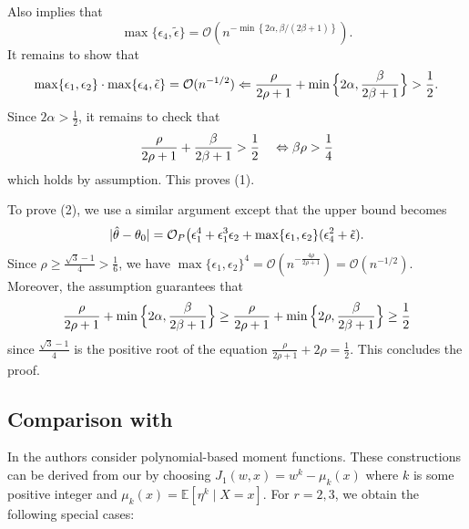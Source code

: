 \documentclass{article}
\def\eps{{\epsilon}}
\def\gO{{\mathcal{O}}}
\newcommand{\E}{\mathbb{E}}
\begin{document}
Also  implies that
$$\max\{\eps_4,\tilde{\eps}\} = \gO\left(n^{-\min\left\{2\alpha,\beta/(2\beta+1)\right\}}\right).$$
It remains to show that
\begin{equation}
    \notag
    \begin{aligned}
        \max\{\eps_1,\eps_2\}\cdot\max\{\eps_4,\tilde{\eps}\} = \gO(n^{-1/2}) \Leftarrow \frac{\rho}{2\rho+1}+\min\Big\{2\alpha,\frac{\beta}{2\beta+1}\Big\} > \frac{1}{2}.
    \end{aligned}
\end{equation}
Since $2\alpha>\frac{1}{2}$, it remains to check that
\begin{equation}
    \notag
    \frac{\rho}{2\rho+1}+\frac{\beta}{2\beta+1} > \frac{1}{2} \quad \Leftrightarrow \beta\rho > \frac{1}{4}
\end{equation}
which holds by assumption. This proves (1).

To prove (2), we use a similar argument except that the upper bound becomes
\begin{equation}
    \notag
    |\hat{\theta}-\theta_0| = \gO_P\big(\eps_1^4+\eps_1^3\eps_2+\max\{\eps_1,\eps_2\}(\eps_4^2+\tilde{\eps}).
\end{equation}
Since $\rho\geq\frac{\sqrt{3}-1}{4}>\frac{1}{6}$, we have $\max\{\eps_1,\eps_2\}^4 = \gO(n^{-\frac{4\rho}{2\rho+1}})=\gO(n^{-1/2})$. Moreover, the assumption guarantees that
\begin{equation}
    \notag
    \frac{\rho}{2\rho+1}+\min\Big\{2\alpha,\frac{\beta}{2\beta+1}\Big\} \geq \frac{\rho}{2\rho+1}+\min\Big\{2\rho,\frac{\beta}{2\beta+1}\Big\}\geq \frac{1}{2}
\end{equation}
since $\frac{\sqrt{3}-1}{4}$ is the positive root of the equation $\frac{\rho}{2\rho+1}+2\rho=\frac{1}{2}$. This concludes the proof.




\subsection{Comparison with \citet{mackey2018orthogonal}}

In \citet{mackey2018orthogonal} the authors consider polynomial-based moment functions. These constructions can be derived from our  by choosing $J_1(w,x)=w^{k}-\mu_{k}(x)$ where $k$ is some positive integer and $\mu_{k}(x)=\E[\eta^{k}\mid X=x]$. For $r=2,3$, we obtain the following special cases:
\end{document}
